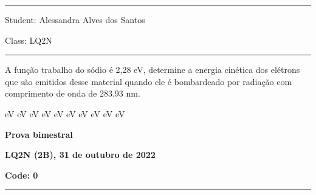 \documentclass[12pt, addpoints]{exam}
\begin{document}
        \vspace{0.5cm} \hrule \vspace{0.5cm}
        \begin{minipage}{0.75\linewidth}
            \begin{flushleft}
                Student: Alessandra Alves dos Santos
            \end{flushleft}
        \end{minipage}
        \begin{minipage}{0.20\linewidth}
            \begin{flushright}
                Class: LQ2N
            \end{flushright}
        \end{minipage}
        \vspace{0.5cm} \hrule \vspace{0.5cm}
        \begin{questions}
\begin{multicols*}{2}
\question A função trabalho do sódio é 2,28 eV, determine a energia cinética dos elétrons que são emitidos desse material quando ele é bombardeado por radiação com comprimento de onda de  283.93 nm.

\begin{oneparchoices}
 eV eV eV eV eV eV eV eV eV eV
\end{oneparchoices}\end{multicols*}
\end{questions}
\newpage
        \begin{minipage}[b]{0.75\linewidth}
            \begin{flushleft}
                {\bf \large Prova bimestral}
            \end{flushleft}
            \begin{flushleft}
                {\bf \large LQ2N (2B), 31 de outubro de 2022}
            \end{flushleft}
        \end{minipage}
        \begin{minipage}[b]{0.20\linewidth}
            \begin{flushright}
                {\bf \large Code: 0}
            \end{flushright}
        \end{minipage}
        \vspace{0.5cm} \hrule \vspace{0.5cm}
\end{document}
